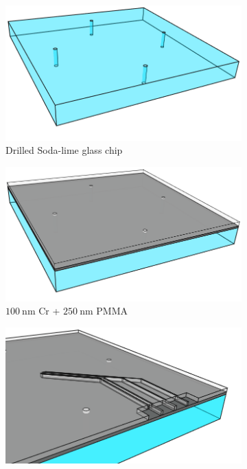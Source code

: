 \documentclass[final]{jyflluk}
\begin{document}
\begin{figure}[H]
    \centering
    \begin{subfigure}{0.48\textwidth}
        \centering
        \includegraphics[width=\linewidth]{steps/1.Drilled.png} 
        \caption{Drilled Soda-lime glass chip} \label{fig:process1}
    \end{subfigure}
    \hfill
    \begin{subfigure}{0.48\textwidth}
        \centering
        \includegraphics[width=\linewidth]{steps/2.Cr-Pmma.png} 
        \caption{$\SI{100}{\nano \metre}$ Cr + $\SI{250}{\nano \metre}$ PMMA} \label{fig:process2}
    \end{subfigure}
    \hfill
    \centering       
    \begin{subfigure}{0.48\textwidth}
        \centering
        \includegraphics[width=\linewidth]{steps/3.Developed.bmp.png} 

\end{subfigure}
\end{figure}
\end{document}
